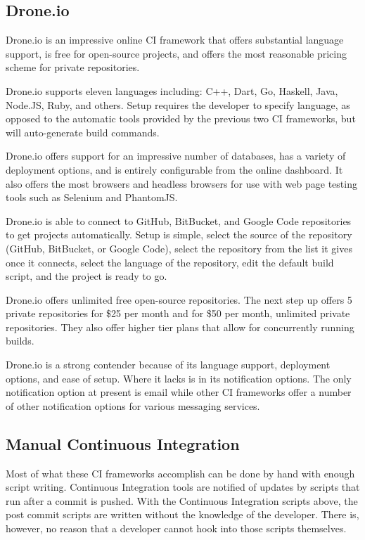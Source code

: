 \documentclass[12pt]{ucthesis}
\begin{document}
\subsection{Drone.io}
Drone.io\cite{DroneIO} is an impressive online CI framework that offers substantial language support, is free for open-source projects, and offers the most reasonable pricing scheme for private repositories.

Drone.io supports eleven languages including: C++, Dart, Go, Haskell, Java, Node.JS, Ruby, and others. Setup requires the developer to specify language, as opposed to the automatic tools provided by the previous two CI frameworks, but will auto-generate build commands.

Drone.io offers support for an impressive number of databases, has a variety of deployment options, and is entirely configurable from the online dashboard. It also offers the most browsers and headless browsers for use with web page testing tools such as Selenium and PhantomJS.

Drone.io is able to connect to GitHub, BitBucket, and Google Code repositories to get projects automatically. Setup is simple, select the source of the repository (GitHub, BitBucket, or Google Code), select the repository from the list it gives once it connects, select the language of the repository, edit the default build script, and the project is ready to go.

Drone.io offers unlimited free open-source repositories. The next step up offers 5 private repositories for \$25 per month and for \$50 per month, unlimited private repositories. They also offer higher tier plans that allow for concurrently running builds.

Drone.io is a strong contender because of its language support, deployment options, and ease of setup. Where it lacks is in its notification options. The only notification option at present is email while other CI frameworks offer a number of other notification options for various messaging services.

\subsection{Manual Continuous Integration}
Most of what these CI frameworks accomplish can be done by hand with enough script writing. Continuous Integration tools are notified of updates by scripts that run after a commit is pushed. With the Continuous Integration scripts above, the post commit scripts are written without the knowledge of the developer. There is, however, no reason that a developer cannot hook into those scripts themselves.
\end{document}
